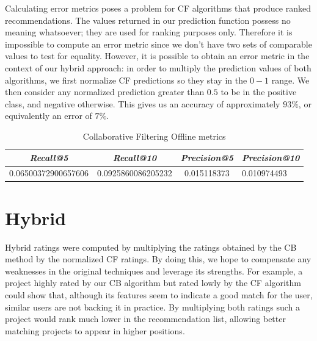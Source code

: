 \documentclass[cic,tc,english]{iiufrgs}
\begin{document}
Calculating error metrics poses a problem for CF algorithms that produce ranked recommendations. The values returned in our prediction function possess no meaning whatsoever; they are used for ranking purposes only. Therefore it is impossible to compute an error metric since we don't have two sets of comparable values to test for equality. However, it is possible to obtain an error metric in the context of our hybrid approach: in order to multiply the prediction values of both algorithms, we first normalize CF predictions so they stay in the $0-1$ range. We then consider any normalized prediction greater than $0.5$ to be in the positive class, and negative otherwise. This gives us an accuracy of approximately $93\%$, or equivalently an error of $7\%$.


\begin{table}[h]
    \caption{Collaborative Filtering Offline metrics}
    \centering
        \begin{tabular}{c|c|c|p{5cm}}
          \hline
          \textit{Recall@5}  &   \textit{Recall@10}  &   \textit{Precision@5} &   \textit{Precision@10} \\
          \hline
          \hline
          0.06500372900657606           & 0.0925860086205232 &  0.015118373  & 0.010974493  \\
          \hline
        \end{tabular}
    \label{tbl:cb_offline_metrics}
\end{table}

\section{Hybrid}
Hybrid ratings were computed by multiplying the ratings obtained by the CB method by the normalized CF ratings. By doing this, we hope to compensate any weaknesses in the original techniques and leverage its strengths. For example, a project highly rated by our CB algorithm but rated lowly by the CF algorithm could show that, although its features seem to indicate a good match for the user, similar users are not backing it in practice. By multiplying both ratings such a project would rank much lower in the recommendation list, allowing better matching projects to appear in higher positions.
\end{document}
